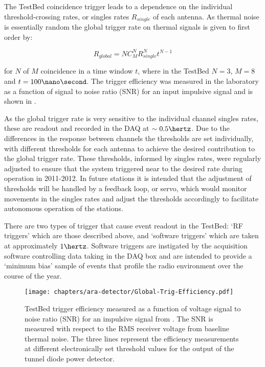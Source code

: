 The TestBed coincidence trigger leads to a dependence on the individual threshold-crossing rates, or singles rates $R_{single}$ of each antenna. As thermal noise is essentially random the global trigger rate on thermal signals is given to first order by:


\begin{equation}
  R_{global} = N C^{N}_{M}R_{single}^{N}t^{N-1}
  \label{eq:ara-detector:TestBed:Trigger-Rate}
\end{equation}

\noindent for $N$ of $M$ coincidence in a time window $t$, where in the TestBed $N=3$, $M=8$ and $t=100\nano\second$. The trigger efficiency was measured in the laboratory as a function of signal to noise ratio (SNR) for an input impulsive signal and is shown in .

As the global trigger rate is very sensitive to the individual channel singles rates, these are readout and recorded in the DAQ at $\sim 0.5 \hertz$. Due to the differences in the response between channels the thresholds are set individually, with different thresholds for each antenna to achieve the desired contribution to the global trigger rate. These thresholds, informed by singles rates, were regularly adjusted to ensure that the system triggered near to the desired rate during operation in 2011-2012. In future stations it is intended that the adjustment of thresholds will be handled by a feedback loop, or servo, which would monitor movements in the singles rates and adjust the thresholds accordingly to facilitate autonomous operation of the stations.

There are two types of trigger that cause event readout in the TestBed: `RF triggers' which are those described above, and `software triggers' which are taken at approximately $1 \hertz$. Software triggers are instigated by the acquisition software controlling data taking in the DAQ box and are intended to provide a `minimum bias' sample of events that profile the radio environment over the course of the year.

\begin{figure}[htpb]
  \centering
  \texttt{[image: chapters/ara-detector/Global-Trig-Efficiency.pdf]}
  \caption{TestBed trigger efficiency measured as a function of voltage signal to noise ratio (SNR) for an impulsive signal from \cite{Allison2012457}. The SNR is measured with respect to the RMS receiver voltage from baseline thermal noise. The three lines represent the efficiency measurements at different electronically set threshold values for the output of the tunnel diode power detector.}
  \label{fig:ara-detector:TestBed:Trigger-Efficiency}
\end{figure}


